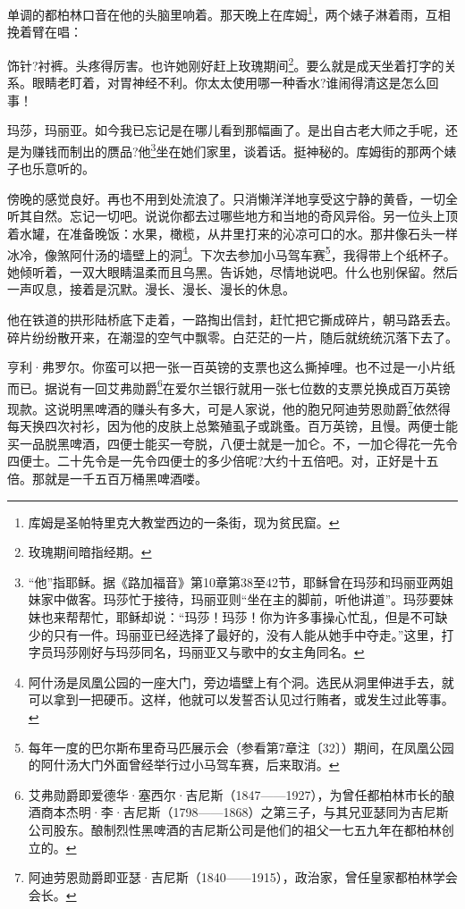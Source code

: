 \par 单调的都柏林口音在他的头脑里响着。那天晚上在库姆\footnote{库姆是圣帕特里克大教堂西边的一条街，现为贫民窟。}，两个婊子淋着雨，互相挽着臂在唱：
\par 饰针?衬裤。头疼得厉害。也许她刚好赶上玫瑰期间\footnote{玫瑰期间暗指经期。}。要么就是成天坐着打字的关系。眼睛老盯着，对胃神经不利。你太太使用哪一种香水?谁闹得清这是怎么回事！
\par 玛莎，玛丽亚。如今我已忘记是在哪儿看到那幅画了。是出自古老大师之手呢，还是为赚钱而制出的赝品?他\footnote{“他”指耶稣。据《路加福音》第10章第38至42节，耶稣曾在玛莎和玛丽亚两姐妹家中做客。玛莎忙于接待，玛丽亚则“坐在主的脚前，听他讲道”。玛莎要妹妹也来帮帮忙，耶稣却说：“玛莎！玛莎！你为许多事操心忙乱，但是不可缺少的只有一件。玛丽亚已经选择了最好的，没有人能从她手中夺走。”这里，打字员玛莎刚好与玛莎同名，玛丽亚又与歌中的女主角同名。}坐在她们家里，谈着话。挺神秘的。库姆街的那两个婊子也乐意听的。
\par 傍晚的感觉良好。再也不用到处流浪了。只消懒洋洋地享受这宁静的黄昏，一切全听其自然。忘记一切吧。说说你都去过哪些地方和当地的奇风异俗。另一位头上顶着水罐，在准备晚饭：水果，橄榄，从井里打来的沁凉可口的水。那井像石头一样冰冷，像煞阿什汤的墙壁上的洞\footnote{阿什汤是凤凰公园的一座大门，旁边墙壁上有个洞。选民从洞里伸进手去，就可以拿到一把硬币。这样，他就可以发誓否认见过行贿者，或发生过此等事。}。下次去参加小马驾车赛\footnote{每年一度的巴尔斯布里奇马匹展示会（参看第7章注〔32〕）期间，在凤凰公园的阿什汤大门外面曾经举行过小马驾车赛，后来取消。}，我得带上个纸杯子。她倾听着，一双大眼睛温柔而且乌黑。告诉她，尽情地说吧。什么也别保留。然后一声叹息，接着是沉默。漫长、漫长、漫长的休息。
\par 他在铁道的拱形陆桥底下走着，一路掏出信封，赶忙把它撕成碎片，朝马路丢去。碎片纷纷散开来，在潮湿的空气中飘零。白茫茫的一片，随后就统统沉落下去了。
\par 亨利·弗罗尔。你蛮可以把一张一百英镑的支票也这么撕掉哩。也不过是一小片纸而已。据说有一回艾弗勋爵\footnote{艾弗勋爵即爱德华·塞西尔·吉尼斯（1847——1927），为曾任都柏林市长的酿酒商本杰明·李·吉尼斯（1798——1868）之第三子，与其兄亚瑟同为吉尼斯公司股东。酿制烈性黑啤酒的吉尼斯公司是他们的祖父一七五九年在都柏林创立的。}在爱尔兰银行就用一张七位数的支票兑换成百万英镑现款。这说明黑啤酒的赚头有多大，可是人家说，他的胞兄阿迪劳恩勋爵\footnote{阿迪劳恩勋爵即亚瑟·吉尼斯（1840——1915），政治家，曾任皇家都柏林学会会长。}依然得每天换四次衬衫，因为他的皮肤上总繁殖虱子或跳蚤。百万英镑，且慢。两便士能买一品脱黑啤酒，四便士能买一夸脱，八便士就是一加仑。不，一加仑得花一先令四便士。二十先令是一先令四便士的多少倍呢?大约十五倍吧。对，正好是十五倍。那就是一千五百万桶黑啤酒喽。
